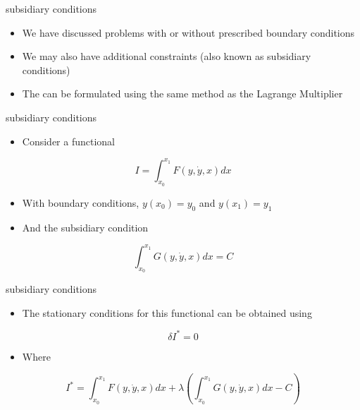 \documentclass[
  letterpaper,
  ignorenonframetext,
  aspectratio=43,
  handout,
  12pt]{beamer}
\providecommand{\tightlist}{%
  \setlength{\itemsep}{0pt}\setlength{\parskip}{0pt}}
\providecommand{\tightlist}{%
\setlength{\itemsep}{0pt}\setlength{\parskip}{0pt}}
\begin{document}
\begin{frame}{subsidiary conditions}
\protect\hypertarget{subsidiary-conditions}{}
\begin{itemize}
\tightlist
\item
  We have discussed problems with or without prescribed boundary
  conditions
\item
  We may also have additional constraints (also known as subsidiary
  conditions)
\item
  The can be formulated using the same method as the Lagrange Multiplier
\end{itemize}
\end{frame}

\begin{frame}{subsidiary conditions}
\protect\hypertarget{subsidiary-conditions-1}{}
\begin{itemize}
\tightlist
\item
  Consider a functional
\end{itemize}

\[I = \int_{x_0}^{x_1} F(y, \dot{y}, x) dx\]

\begin{itemize}
\tightlist
\item
  With boundary conditions, \(y(x_0)=y_0\) and \(y(x_1)=y_1\)
\item
  And the subsidiary condition
\end{itemize}

\[\int_{x_0}^{x_1} G(y, \dot{y}, x)dx = C\]
\end{frame}

\begin{frame}{subsidiary conditions}
\protect\hypertarget{subsidiary-conditions-2}{}
\begin{itemize}
\tightlist
\item
  The stationary conditions for this functional can be obtained using
\end{itemize}

\[\delta I^* = 0\]

\begin{itemize}
\tightlist
\item
  Where
\end{itemize}

\[I^* = \int_{x_0}^{x_1} F(y, \dot{y}, x) dx + \lambda\left(\int_{x_0}^{x_1} G(y, \dot{y}, x)dx - C\right)\]
\end{frame}
\end{document}
